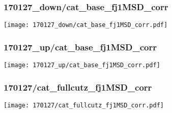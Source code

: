 \begin{frame}
   \frametitle{\small 170127\_down/cat\_base\_fj1MSD\_corr}
   \centering
   \texttt{[image: 170127\_down/cat\_base\_fj1MSD\_corr.pdf]}
\end{frame}

\begin{frame}
   \frametitle{\small 170127\_up/cat\_base\_fj1MSD\_corr}
   \centering
   \texttt{[image: 170127\_up/cat\_base\_fj1MSD\_corr.pdf]}
\end{frame}

\begin{frame}
   \frametitle{\small 170127/cat\_fullcutz\_fj1MSD\_corr}
   \centering
   \texttt{[image: 170127/cat\_fullcutz\_fj1MSD\_corr.pdf]}
\end{frame}

